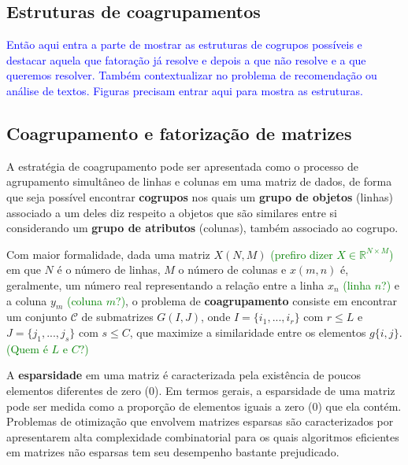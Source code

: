 \documentclass[
    12pt,                %
    oneside,            %
    a4paper,            %
    english,            %
    brazil                %
    ]{abntex2ppgsi}
\begin{document}
\subsection{Estruturas de coagrupamentos}

\textcolor{blue}{Então aqui entra a parte de mostrar as estruturas de cogrupos possíveis e destacar aquela que fatoração já resolve e depois a que não resolve e a que queremos resolver. Também contextualizar no problema de recomendação ou análise de textos. Figuras precisam entrar aqui para mostra as estruturas.}

\subsection{Coagrupamento e fatorização de matrizes}

A estratégia de coagrupamento pode ser apresentada como o processo de agrupamento simultâneo de linhas e colunas em uma matriz de dados, de forma que seja possível encontrar \textbf{cogrupos} nos quais um \textbf{grupo de objetos} (linhas) associado a um deles diz respeito a objetos que são similares entre si considerando um \textbf{grupo de atributos} (colunas), também associado ao cogrupo.

Com maior formalidade, dada uma matriz $X(N,M)$ \textcolor{green}{(prefiro dizer $X\in\mathds{R}^{N\times M}$)} em que $N$ é o número de linhas, $M$ o número de colunas e $x(m,n)$ é, geralmente, um número real representando a relação entre a linha $x_n$ \textcolor{green}{(linha $n$?)} e a coluna $y_m$ \textcolor{green}{(coluna $m$?)}, o problema de \textbf{coagrupamento} consiste em encontrar um conjunto $\mathcal{C}$ de submatrizes $G(I,J)$, onde $I=\{i_1, ..., i_r\}$ com $r \leq L$ e $J=\{j_1, ..., j_s\}$ com $s \leq C$, que maximize a similaridade entre os elementos $g\{i,j\}$. \textcolor{green}{(Quem é $L$ e $C$?)}


A \textbf{esparsidade} em uma matriz é caracterizada pela existência de poucos elementos diferentes de zero ({0}). Em termos gerais, a esparsidade de uma matriz pode ser medida como a proporção de elementos iguais a zero ($0$) que ela contém. Problemas de otimização que envolvem matrizes esparsas são caracterizados por apresentarem alta complexidade combinatorial para os quais algoritmos eficientes em matrizes não esparsas tem seu desempenho bastante prejudicado.

\end{document}
